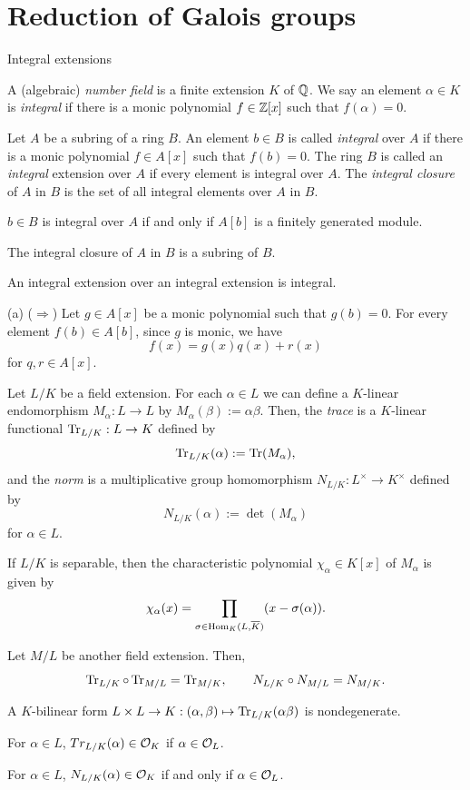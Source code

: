 \documentclass{../../large}
\begin{document}
\section{Reduction of Galois groups}

{Integral extensions}

\begin{prb}
A (algebraic) \emph{number field} is a finite extension $K$ of $\mathbb{Q}$.
We say an element $\alpha\in K$ is \emph{integral} if there is a monic polynomial $f\in\mathbb{Z}[x]$ such that $f(\alpha)=0$.
\end{prb}

\begin{prb}
Let $A$ be a subring of a ring $B$.
An element $b\in B$ is called \emph{integral} over $A$ if there is a monic polynomial $f\in A[x]$ such that $f(b)=0$.
The ring $B$ is called an \emph{integral} extension over $A$ if every element is integral over $A$.
The \emph{integral closure} of $A$ in $B$ is the set of all integral elements over $A$ in $B$.
\begin{parts}
\item $b\in B$ is integral over $A$ if and only if $A[b]$ is a finitely generated module.
\item The integral closure of $A$ in $B$ is a subring of $B$.
\item An integral extension over an integral extension is integral.
\end{parts}
\end{prb}
\begin{pf}
(a)
($\Rightarrow$)
Let $g\in A[x]$ be a monic polynomial such that $g(b)=0$.
For every element $f(b)\in A[b]$, since $g$ is monic, we have
\[f(x)=g(x)q(x)+r(x)\]
for $q,r\in A[x]$.
\end{pf}


\begin{prb}
Let $L/K$ be a field extension.
For each $\alpha\in L$ we can define a $K$-linear endomorphism $M_\alpha:L\to L$ by $M_\alpha(\beta):=\alpha\beta$.
Then, the \emph{trace} is a $K$-linear functional $\operatorname{Tr}_{L/K}:L\to K$ defined by
\[\operatorname{Tr}_{L/K}(\alpha):=\operatorname{Tr}(M_\alpha),\]
and the \emph{norm} is a multiplicative group homomorphism $N_{L/K}:L^\times\to K^\times$ defined by
\[N_{L/K}(\alpha):=\det(M_\alpha)\]
for $\alpha\in L$.
\begin{parts}
\item If $L/K$ is separable, then the characteristic polynomial $\chi_\alpha\in K[x]$ of $M_\alpha$ is given by
\[\chi_\alpha(x)=\prod_{\sigma\in\operatorname{Hom}_K(L,\overline K)}(x-\sigma(\alpha)).\]
\item Let $M/L$ be another field extension. Then,
\[\operatorname{Tr}_{L/K}\circ\operatorname{Tr}_{M/L}=\operatorname{Tr}_{M/K},\qquad N_{L/K}\circ N_{M/L}=N_{M/K}.\]
\item A $K$-bilinear form $L\times L\to K:(\alpha,\beta)\mapsto\operatorname{Tr}_{L/K}(\alpha\beta)$ is nondegenerate.
\item For $\alpha\in L$, $Tr_{L/K}(\alpha)\in\mathcal{O}_K$ if $\alpha\in\mathcal{O}_L$.
\item For $\alpha\in L$, $N_{L/K}(\alpha)\in\mathcal{O}_K$ if and only if $\alpha\in\mathcal{O}_L$.
\end{parts}
\end{prb}
\end{document}

